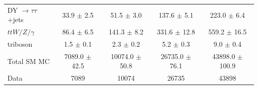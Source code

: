 \begin{table}[hbt]
\begin{center}
\begin{tabular}{l |  c  c  c  c}
                DY $\rightarrow \tau\tau$+jets   &      33.9 $\pm$ 2.5   &      51.5 $\pm$ 3.0   &     137.6 $\pm$ 5.1   &     223.0 $\pm$ 6.4  \\
                                $ttW/Z/\gamma$   &      86.4 $\pm$ 6.5   &     141.3 $\pm$ 8.2   &    331.6 $\pm$ 12.8   &    559.2 $\pm$ 16.5  \\
                                      triboson   &       1.5 $\pm$ 0.1   &       2.3 $\pm$ 0.2   &       5.2 $\pm$ 0.3   &       9.0 $\pm$ 0.4  \\
\hline
                                   Total SM MC   &   7089.0 $\pm$ 42.5   &  10074.0 $\pm$ 50.8   &  26735.0 $\pm$ 76.1   & 43898.0 $\pm$ 100.9  \\
\hline
                                          Data   &                7089   &               10074   &               26735   &               43898  \\
\hline

\end{tabular}
\end{center}
\end{table}

